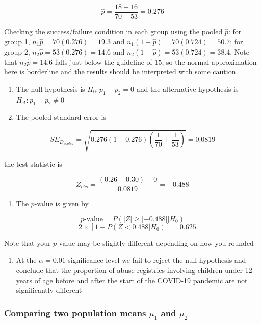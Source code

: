 \documentclass[
]{article}
\providecommand{\tightlist}{%
  \setlength{\itemsep}{0pt}\setlength{\parskip}{0pt}}
\begin{document}
\[\hat{p} = \frac{18+16}{70+53} = 0.276\]

Checking the success/failure condition in each group using the pooled
\(\hat{p}\): for group 1, \(n_1\hat{p} = 70(0.276) = 19.3\) and
\(n_1(1-\hat{p}) = 70(0.724) = 50.7\); for group 2,
\(n_2\hat{p} = 53(0.276) = 14.6\) and
\(n_2(1-\hat{p}) = 53(0.724) = 38.4\). Note that \(n_2\hat{p} = 14.6\)
falls just below the guideline of \(15\), so the normal approximation
here is borderline and the results should be interpreted with some
caution

\begin{enumerate}
\def\labelenumi{\arabic{enumi}.}
\setcounter{enumi}{1}
\item
  {The null hypothesis is \(H_0: p_1 - p_2 = 0\) and the alternative
  hypothesis is \(H_A: p_1 - p_2 \neq 0\)}
\item
  The pooled standard error is
\end{enumerate}

\[SE_{D_{pooled}} =  \sqrt{0.276(1-0.276)\left(\frac{1}{70}+\frac{1}{53}\right)} = 0.0819\]

the test statistic is

\[ Z_{obs} = \frac{(0.26 - 0.30)-0}{0.0819} = -0.488\]

\begin{enumerate}
\def\labelenumi{\arabic{enumi}.}
\setcounter{enumi}{3}
\tightlist
\item
  The \(p\)-value is given by
\end{enumerate}

\[ p\text{-value} = P(|Z|\geq|-0.488||H_0)\]
\[ = 2\times \left[1 - P(Z < 0.488|H_0)\right] = 0.625\]

Note that your \(p\)-value may be slightly different depending on how
you rounded

\begin{enumerate}
\def\labelenumi{\arabic{enumi}.}
\setcounter{enumi}{4}
\tightlist
\item
  {At the \(\alpha = 0.01\) significance level we fail to reject the
  null hypothesis and conclude that the proportion of abuse registries
  involving children under 12 years of age before and after the start of
  the COVID-19 pandemic are not significantly different}
\end{enumerate}

\subsubsection{\texorpdfstring{Comparing two population means \(\mu_1\)
and
\(\mu_2\)}{Comparing two population means \textbackslash mu\_1 and \textbackslash mu\_2}}\label{comparing-two-population-means-mu_1-and-mu_2}
\end{document}

